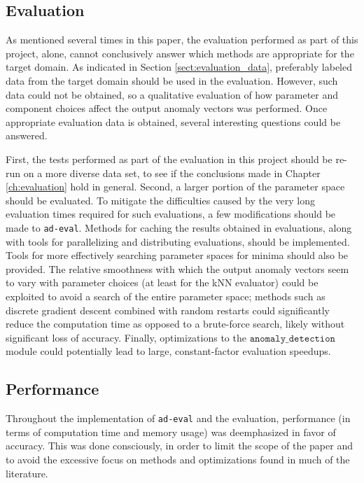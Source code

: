 \subsection{Evaluation}

As mentioned several times in this paper, the evaluation performed as part of this project, alone, cannot conclusively answer which methods are appropriate for the target domain. As indicated in Section \ref{sect:evaluation_data}, preferably labeled data from the target domain should be used in the evaluation. However, such data could not be obtained, so a qualitative evaluation of how parameter and component choices affect the output anomaly vectors was performed. Once appropriate evaluation data is obtained, several interesting questions could be answered.

First, the tests performed as part of the evaluation in this project should be re-run on a more diverse data set, to see if the conclusions made in Chapter \ref{ch:evaluation} hold in general. Second, a larger portion of the parameter space should be evaluated. To mitigate the difficulties caused by the very long evaluation times required for such evaluations, a few modifications should be made to \texttt{ad-eval}. Methods for caching the results obtained in evaluations, along with tools for parallelizing and distributing evaluations, should be implemented. Tools for more effectively searching parameter spaces for minima should also be provided. The relative smoothness with which the output anomaly vectors seem to vary with parameter choices (at least for the kNN evaluator) could be exploited to avoid a search of the entire parameter space; methods such as discrete gradient descent combined with random restarts could significantly reduce the computation time as opposed to a brute-force search, likely without significant loss of accuracy. Finally, optimizations to the $\texttt{anomaly\_detection}$ module could potentially lead to large, constant-factor evaluation speedups.

\subsection{Performance}

Throughout the implementation of \texttt{ad-eval} and the evaluation, performance (in terms of computation time and memory usage) was deemphasized in favor of accuracy. This was done consciously, in order to limit the scope of the paper and to avoid the excessive focus on methods and optimizations found in much of the literature.

